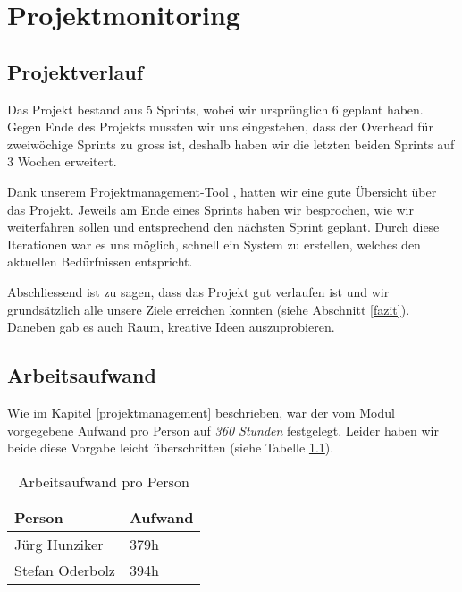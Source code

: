 \chapter{Projektmonitoring}
\label{projektmonitoring}





\section{Projektverlauf}
Das Projekt bestand aus 5 Sprints, wobei wir ursprünglich 6 geplant haben.
Gegen Ende des Projekts mussten wir uns eingestehen, dass der Overhead für zweiwöchige Sprints zu gross ist, deshalb haben wir die letzten beiden Sprints auf 3 Wochen erweitert.

Dank unserem Projektmanagement-Tool , hatten wir eine gute Übersicht über das Projekt.
Jeweils am Ende eines Sprints haben wir besprochen, wie wir weiterfahren sollen und entsprechend den nächsten Sprint geplant.
Durch diese Iterationen war es uns möglich, schnell ein System zu erstellen, welches den aktuellen Bedürfnissen entspricht.

Abschliessend ist zu sagen, dass das Projekt gut verlaufen ist und wir grundsätzlich alle unsere Ziele erreichen konnten (siehe Abschnitt \ref{fazit}).
Daneben gab es auch Raum, kreative Ideen auszuprobieren.

\section{Arbeitsaufwand}
Wie im Kapitel \ref{projektmanagement} beschrieben, war der vom Modul vorgegebene Aufwand pro Person auf \emph{360 Stunden} festgelegt. Leider haben wir beide diese Vorgabe leicht überschritten (siehe Tabelle \ref{projektmanagement-arbeitsaufwand}).

\begin{table}[H]
\centering
\begin{tabular}{|l|l|}
\hline 
\textbf{Person} & \textbf{Aufwand} \\ 
\hline 
Jürg Hunziker & 379h \\
\hline 
Stefan Oderbolz & 394h \\  
\hline 
\end{tabular}
\caption{Arbeitsaufwand pro Person}
\label{projektmanagement-arbeitsaufwand}
\end{table} 

